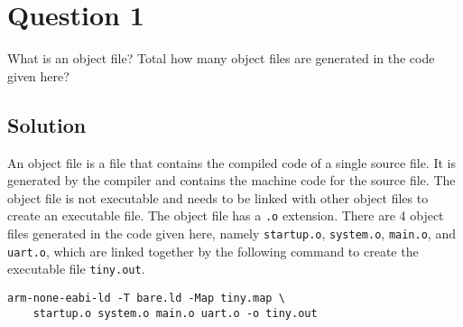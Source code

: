 \section*{Question 1}

What is an object file?
Total how many object files are generated in the code given here?

\subsection*{Solution}

An object file is a file that contains the compiled code of a single source file.
It is generated by the compiler and contains the machine code for the source file.
The object file is not executable and needs to be linked with other object files to create an executable file.
The object file has a \texttt{.o} extension.
There are 4 object files generated in the code given here, namely \texttt{startup.o}, \texttt{system.o}, \texttt{main.o}, and \texttt{uart.o}, which are linked together by the following command to create the executable file \texttt{tiny.out}.
\begin{verbatim}
arm-none-eabi-ld -T bare.ld -Map tiny.map \
    startup.o system.o main.o uart.o -o tiny.out
\end{verbatim}
